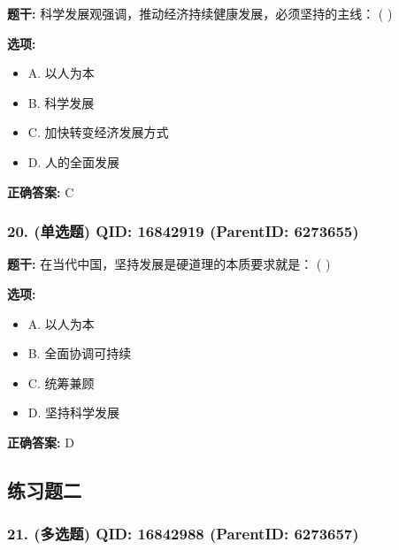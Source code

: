 \documentclass[12pt,UTF8]{ctexart}
\begin{document}
\textbf{题干:}
科学发展观强调，推动经济持续健康发展，必须坚持的主线： ( )



\textbf{选项:}
\begin{itemize}[leftmargin=*]

  \item A. 以人为本

  \item B. 科学发展

  \item C. 加快转变经济发展方式

  \item D. 人的全面发展

\end{itemize}

\textbf{正确答案:}
C

\vspace{0.3em}\hrulefill\vspace{0.7em}

\subsubsection*{20. (单选题) \small QID: 16842919 (ParentID: 6273655)}

\textbf{题干:}
在当代中国，坚持发展是硬道理的本质要求就是： ( )



\textbf{选项:}
\begin{itemize}[leftmargin=*]

  \item A. 以人为本

  \item B. 全面协调可持续

  \item C. 统筹兼顾

  \item D. 坚持科学发展

\end{itemize}

\textbf{正确答案:}
D

\vspace{0.3em}\hrulefill\vspace{0.7em}

\subsection*{练习题二}

\subsubsection*{21. (多选题) \small QID: 16842988 (ParentID: 6273657)}
\end{document}
